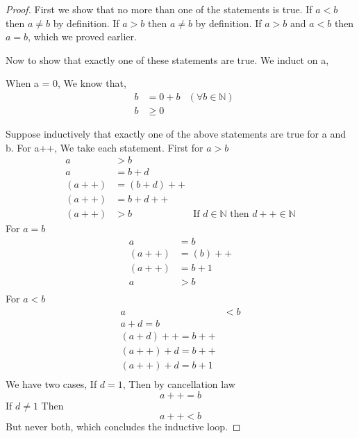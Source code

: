 \documentclass[11pt]{report}
\begin{document}
\begin{proof}
	First we show that no more than one of the statements is true.
	If $a<b$ then $a \neq b$ by definition. If $a>b$ then $a \neq b$ by definition. If $a>b$ and $a<b$ then $a=b$, which we proved earlier.

	Now to show that exactly one of these statements are true.
	We induct on a,

	When a = 0,
	We know that,
	\begin{align*}
		 & b & = 0 + b & (\forall b \in \mathbb{N}) \\
		 & b & \geq 0
	\end{align*}

	Suppose inductively that exactly one of the above statements are true for a and b.
	For a++,
	We take each statement. First for $a>b$
	\begin{align*}
		a     & > b                                                                  \\
		a     & = b + d                                                              \\
		(a++) & = (b + d)++                                                          \\
		(a++) & = b + d++                                                            \\
		(a++) & > b         & \text{If $d \in \mathbb{N}$ then $d++ \in \mathbb{N}$}
	\end{align*}
	For $a=b$
	\begin{align*}
		a     & = b     \\
		(a++) & = (b)++ \\
		(a++) & = b + 1 \\
		a     & > b     \\
	\end{align*}
	For $a<b$
	\begin{align*}
		a & <b            \\
		a + d = b         \\
		(a + d)++ = b++   \\
		(a++) + d = b++   \\
		(a++) + d = b + 1 \\
	\end{align*}
	We have two cases,
	If $d = 1$,
	Then by cancellation law
	$$ a++ = b $$
	If $d \neq 1$
	Then
	$$a++ < b$$
	But never both, which concludes the inductive loop.
\end{proof}
\end{document}
